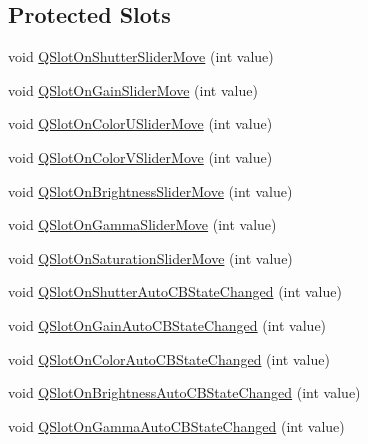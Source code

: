 \subsection*{Protected Slots}
\begin{DoxyCompactItemize}
\item 
void \hyperlink{classsvl_qt_widget_vid_cap_src_image_properties_a3fce04f2f2681b1c4100c933b1f2e227}{Q\+Slot\+On\+Shutter\+Slider\+Move} (int value)
\item 
void \hyperlink{classsvl_qt_widget_vid_cap_src_image_properties_a58f6f85158bd32c3cdb62be87a7dca5f}{Q\+Slot\+On\+Gain\+Slider\+Move} (int value)
\item 
void \hyperlink{classsvl_qt_widget_vid_cap_src_image_properties_a2e70426d833ac431d68940b290333029}{Q\+Slot\+On\+Color\+U\+Slider\+Move} (int value)
\item 
void \hyperlink{classsvl_qt_widget_vid_cap_src_image_properties_a8edc8ef88956d71ef7b583523e63bf45}{Q\+Slot\+On\+Color\+V\+Slider\+Move} (int value)
\item 
void \hyperlink{classsvl_qt_widget_vid_cap_src_image_properties_af705c687c06db535edbfde2a8f1c74dd}{Q\+Slot\+On\+Brightness\+Slider\+Move} (int value)
\item 
void \hyperlink{classsvl_qt_widget_vid_cap_src_image_properties_a0a8df417b17aa3f03a43b46463d3e7f3}{Q\+Slot\+On\+Gamma\+Slider\+Move} (int value)
\item 
void \hyperlink{classsvl_qt_widget_vid_cap_src_image_properties_a9dfaf24de7c001739fc9a870458ff8f5}{Q\+Slot\+On\+Saturation\+Slider\+Move} (int value)
\item 
void \hyperlink{classsvl_qt_widget_vid_cap_src_image_properties_a39f2860f42dc260d8618ea0a2b9488d5}{Q\+Slot\+On\+Shutter\+Auto\+C\+B\+State\+Changed} (int value)
\item 
void \hyperlink{classsvl_qt_widget_vid_cap_src_image_properties_af4b31fc1848b2eac39f5fe282edce85b}{Q\+Slot\+On\+Gain\+Auto\+C\+B\+State\+Changed} (int value)
\item 
void \hyperlink{classsvl_qt_widget_vid_cap_src_image_properties_a6e72d5e1bfd9ee47b5eac7a06d4fe5d5}{Q\+Slot\+On\+Color\+Auto\+C\+B\+State\+Changed} (int value)
\item 
void \hyperlink{classsvl_qt_widget_vid_cap_src_image_properties_aeb806e220711861002d77c2549e31f3d}{Q\+Slot\+On\+Brightness\+Auto\+C\+B\+State\+Changed} (int value)
\item 
void \hyperlink{classsvl_qt_widget_vid_cap_src_image_properties_a76230c1ac83642571f9d5afe2e50d905}{Q\+Slot\+On\+Gamma\+Auto\+C\+B\+State\+Changed} (int value)

\end{DoxyCompactItemize}
